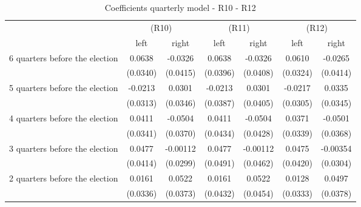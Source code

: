 \begin{table}[!ht]\centering \scriptsize
\def\sym#1{\ifmmode^{#1}\else\(^{#1}\)\fi}
\caption{Coefficients quarterly model - R10 - R12}
\begin{tabular}{l*{6}{c}}
\hline\hline
                    &\multicolumn{2}{c}{(R10)}&\multicolumn{2}{c}{(R11)}&\multicolumn{2}{c}{(R12)}\\
&\multicolumn{1}{c}{left}&\multicolumn{1}{c}{right}&\multicolumn{1}{c}{left}&\multicolumn{1}{c}{right}&\multicolumn{1}{c}{left}&\multicolumn{1}{c}{right}\\
\hline
 6 quarters before the election&      0.0638         &     -0.0326         &      0.0638         &     -0.0326         &      0.0610         &     -0.0265         \\
                    &    (0.0340)         &    (0.0415)         &    (0.0396)         &    (0.0408)         &    (0.0324)         &    (0.0414)         \\
[0,12em]
 5 quarters before the election&     -0.0213         &      0.0301         &     -0.0213         &      0.0301         &     -0.0217         &      0.0335         \\
                    &    (0.0313)         &    (0.0346)         &    (0.0387)         &    (0.0405)         &    (0.0305)         &    (0.0345)         \\
[0,12em]
 4 quarters before the election&      0.0411         &     -0.0504         &      0.0411         &     -0.0504         &      0.0371         &     -0.0501         \\
                    &    (0.0341)         &    (0.0370)         &    (0.0434)         &    (0.0428)         &    (0.0339)         &    (0.0368)         \\
[0,12em]
 3 quarters before the election&      0.0477         &    -0.00112         &      0.0477         &    -0.00112         &      0.0475         &    -0.00354         \\
                    &    (0.0414)         &    (0.0299)         &    (0.0491)         &    (0.0462)         &    (0.0420)         &    (0.0304)         \\
[0,12em]
 2 quarters before the election&      0.0161         &      0.0522         &      0.0161         &      0.0522         &      0.0128         &      0.0497         \\
                    &    (0.0336)         &    (0.0373)         &    (0.0432)         &    (0.0454)         &    (0.0333)         &    (0.0378)         \\

\end{tabular}
\end{table}
